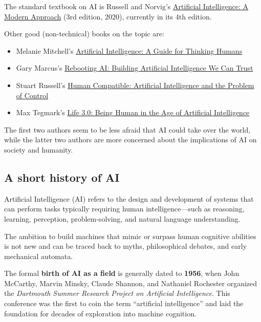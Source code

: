 \documentclass[
]{book}
\providecommand{\tightlist}{%
  \setlength{\itemsep}{0pt}\setlength{\parskip}{0pt}}
\begin{document}
The standard textbook on AI is Russell and Norvig's
\href{hhttps://people.engr.tamu.edu/guni/csce625/slides/AI.pdf}{Artificial Intelligence: A Modern Approach}
(3rd edition, 2020), currently in its 4th edition.

Other good (non-technical) books on the topic are:

\begin{itemize}
\tightlist
\item
  Melanie Mitchell's \href{https://melaniemitchell.me/aibook/}{Artificial Intelligence: A Guide for Thinking Humans}
\item
  Gary Marcus's \href{Rebooting\%20Ai:\%20Building\%20Artificial\%20Intelligence\%20We\%20Can\%20Trust}{Rebooting AI: Building Artificial Intelligence We Can Trust}
\item
  Stuart Russell's \href{https://en.wikipedia.org/wiki/Human_Compatible}{Human Compatible: Artificial Intelligence and the Problem of Control}
\item
  Max Tegmark's \href{https://en.wikipedia.org/wiki/Life_3.0}{Life 3.0: Being Human in the Age of Artificial Intelligence}
\end{itemize}

The first two authors seem to be less afraid that AI could take over the world,
while the latter two authors are more concerned about the implications of AI on society and humanity.

\subsection{A short history of AI}\label{a-short-history-of-ai}

Artificial Intelligence (AI) refers to the design and development of systems
that can perform tasks typically requiring human intelligence---such as reasoning,
learning, perception, problem-solving, and natural language understanding.

The ambition to build machines that mimic or surpass human cognitive abilities
is not new and can be traced back to myths, philosophical debates, and early
mechanical automata.

The formal \textbf{birth of AI as a field} is generally dated to \textbf{1956},
when John McCarthy, Marvin Minsky, Claude Shannon, and Nathaniel Rochester
organized the \emph{Dartmouth Summer Research Project on Artificial Intelligence}.
This conference was the first to coin the term ``artificial intelligence'' and
laid the foundation for decades of exploration into machine cognition.
\end{document}
